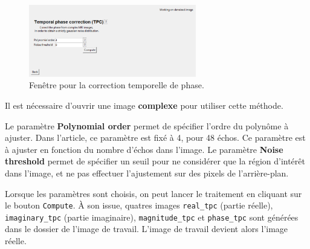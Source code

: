 \documentclass[french]{article}
\begin{document}
\begin{figure}[ht]
  \centering
  \includegraphics[width=0.65\textwidth]{fig/tpc}
  \caption{Fenêtre pour la correction temporelle de phase.}
  \label{fig:tpc}
\end{figure}


Il est nécessaire d'ouvrir une image \textbf{complexe} pour utiliser
cette méthode.

Le paramètre \textbf{Polynomial order} permet de spécifier l'ordre du
polynôme à ajuster. Dans l'article, ce paramètre est fixé à 4, pour 48
échos. Ce paramètre est à ajuster en fonction du nombre d'échos dans
l'image. Le paramètre \textbf{Noise threshold} permet de spécifier un
seuil pour ne considérer que la région d'intérêt dans l'image, et ne
pas effectuer l'ajustement sur des pixels de l'arrière-plan.

Lorsque les paramètres sont choisis, on peut lancer le traitement en
cliquant sur le bouton \texttt{Compute}. À son issue, quatres images
\texttt{real\_tpc} (partie réelle), \texttt{imaginary\_tpc} (partie imaginaire),
\texttt{magnitude\_tpc} et \texttt{phase\_tpc} sont générées dans le dossier de
l'image de travail. L'image de travail devient alors l'image réelle.



\end{document}
